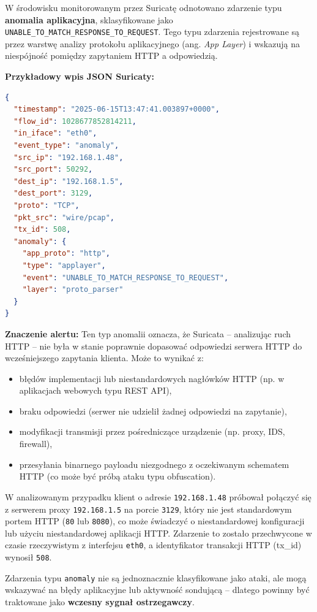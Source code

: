 \documentclass[
    left=2.5cm,         %
    right=2.5cm,        %
    top=2.5cm,          %
    bottom=3cm,         %
    bindingoffset=6mm,  %
    nohyphenation=true %
]{eiti/eiti-thesis} %
\begin{document}
W środowisku monitorowanym przez Suricatę odnotowano zdarzenie typu \textbf{anomalia aplikacyjna}, sklasyfikowane jako \texttt{UNABLE\_TO\_MATCH\_RESPONSE\_TO\_REQUEST}. Tego typu zdarzenia rejestrowane są przez warstwę analizy protokołu aplikacyjnego (ang. \textit{App Layer}) i wskazują na niespójność pomiędzy zapytaniem HTTP a odpowiedzią.

\textbf{Przykładowy wpis JSON Suricaty:}
\begin{lstlisting}[language=json, caption={Alert typu anomaly: UNABLE\_TO\_MATCH\_RESPONSE\_TO\_REQUEST}, label={lst:suricata-anomaly-mismatch}]
{
  "timestamp": "2025-06-15T13:47:41.003897+0000",
  "flow_id": 1028677852814211,
  "in_iface": "eth0",
  "event_type": "anomaly",
  "src_ip": "192.168.1.48",
  "src_port": 50292,
  "dest_ip": "192.168.1.5",
  "dest_port": 3129,
  "proto": "TCP",
  "pkt_src": "wire/pcap",
  "tx_id": 508,
  "anomaly": {
    "app_proto": "http",
    "type": "applayer",
    "event": "UNABLE_TO_MATCH_RESPONSE_TO_REQUEST",
    "layer": "proto_parser"
  }
}
\end{lstlisting}

\textbf{Znaczenie alertu:}
Ten typ anomalii oznacza, że Suricata – analizując ruch HTTP – nie była w stanie poprawnie dopasować odpowiedzi serwera HTTP do wcześniejszego zapytania klienta. Może to wynikać z:
\begin{itemize}
  \item błędów implementacji lub niestandardowych nagłówków HTTP (np. w aplikacjach webowych typu REST API),
  \item braku odpowiedzi (serwer nie udzielił żadnej odpowiedzi na zapytanie),
  \item modyfikacji transmisji przez pośredniczące urządzenie (np. proxy, IDS, firewall),
  \item przesyłania binarnego payloadu niezgodnego z oczekiwanym schematem HTTP (co może być próbą ataku typu obfuscation).
\end{itemize}

W analizowanym przypadku klient o adresie \texttt{192.168.1.48} próbował połączyć się z serwerem proxy \texttt{192.168.1.5} na porcie \texttt{3129}, który nie jest standardowym portem HTTP (\texttt{80} lub \texttt{8080}), co może świadczyć o niestandardowej konfiguracji lub użyciu niestandardowej aplikacji HTTP. Zdarzenie to zostało przechwycone w czasie rzeczywistym z interfejsu \texttt{eth0}, a identyfikator transakcji HTTP (tx\_id) wynosił \texttt{508}.

Zdarzenia typu \texttt{anomaly} nie są jednoznacznie klasyfikowane jako ataki, ale mogą wskazywać na błędy aplikacyjne lub aktywność sondującą – dlatego powinny być traktowane jako \textbf{wczesny sygnał ostrzegawczy}.
\end{document}
